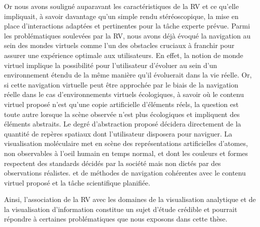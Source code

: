 Or nous avons souligné auparavant les caractéristiques de la RV et ce qu'elle impliquait, à savoir davantage qu'un simple rendu stéréoscopique, la mise en place d'interactions adaptées et pertinentes pour la tâche experte prévue.
Parmi les problématiques soulevées par la RV, nous avons déjà évoqué la navigation au sein des mondes virtuels comme l'un des obstacles cruciaux à franchir pour assurer une expérience optimale aux utilisateurs. En effet, la notion de monde virtuel implique la possibilité pour l'utilisateur d'évoluer au sein d'un environnement étendu de la même manière qu'il évoluerait dans la vie réelle. Or, si cette navigation virtuelle peut être approchée par le biais de la navigation réelle dans le cas d'environnements virtuels écologiques, à savoir où le contenu virtuel proposé n'est qu'une copie artificielle d'éléments réels, la question est toute autre lorsque la scène observée n'est plus écologiques et impliquent des éléments abstraits. Le degré d'abstraction proposé décidera directement de la quantité de repères spatiaux dont l'utilisateur disposera pour naviguer. La visualisation moléculaire met en scène des représentations artificielles d'atomes, non observables à l'oeil humain en temps normal, et dont les couleurs et formes respectent des standards décidés par la société mais non dictés par des observations réalistes.
et de méthodes de navigation cohérentes avec le contenu virtuel proposé et la tâche scientifique planifiée.

Ainsi, l'association de la RV avec les domaines de la visualisation analytique et de la visualisation d'information constitue un sujet d'étude crédible et pourrait répondre à certaines problématiques que nous exposons dans cette thèse.




